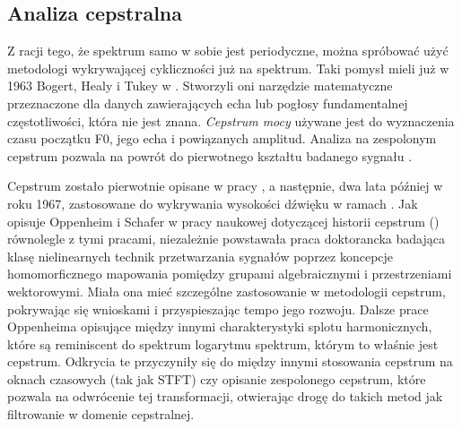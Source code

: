 \documentclass[12pt,a4paper,twoside]{mwart}
\begin{document}
\subsection{Analiza cepstralna}\label{sec:f0:ceps}
Z racji tego, że spektrum samo w sobie jest periodyczne, można spróbować użyć metodologi wykrywającej cykliczności już na spektrum. Taki pomysł mieli już w 1963 Bogert, Healy i Tukey w \cite{Transcription:Bogert:FirstCepstrum}. Stworzyli oni narzędzie matematyczne przeznaczone dla danych zawierających echa lub pogłosy fundamentalnej częstotliwości, która nie jest znana. \textit{Cepstrum mocy} używane jest do wyznaczenia czasu początku F0, jego echa i powiązanych amplitud. Analiza na zespolonym cepstrum pozwala na powrót do pierwotnego kształtu badanego sygnału \cite{Transcription:Childers:CepstruGuide} \cite[46-59]{Transcription:Quenneville:Thesis}.

Cepstrum zostało pierwotnie opisane w pracy \cite{Transcription:Bogert:FirstCepstrum}, a następnie, dwa lata później w roku 1967, zastosowane do wykrywania wysokości dźwięku w ramach \cite{Transcription:Noll:CepstrumPitchDetermination}. Jak opisuje Oppenheim i Schafer w pracy naukowej dotyczącej historii cepstrum (\cite[95-99]{Transcription:Oppenheim:HistoryOfCepstrum}) równolegle z tymi pracami, niezależnie powstawała praca doktorancka \cite{Transcription:Oppenheim:Superposition} badająca klasę nielinearnych technik przetwarzania sygnałów poprzez koncepcje homomorficznego mapowania pomiędzy grupami algebraicznymi i przestrzeniami wektorowymi. Miała ona mieć szczególne zastosowanie w metodologii cepstrum, pokrywając się wnioskami  i przyspieszając tempo jego rozwoju. Dalsze prace Oppenheima opisujące między innymi charakterystyki splotu harmonicznych, które są reminiscent do spektrum logarytmu spektrum, którym to właśnie jest cepstrum. Odkrycia te przyczyniły się do między innymi stosowania cepstrum na oknach czasowych (tak jak STFT) czy opisanie zespolonego cepstrum, które pozwala na odwrócenie tej transformacji, otwierając drogę do takich metod jak filtrowanie w domenie cepstralnej.
\end{document}
